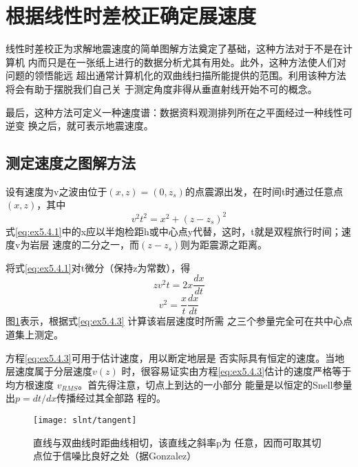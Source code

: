 \section{根据线性时差校正确定展速度}
\label{sec:5.4}

线性时差校正为求解地震速度的简单图解方法奠定了基础，这种方法对于不是在计算机
内而只是在一张纸上进行的数据分析尤其有用处。此外，这种方法使人们对问题的领悟能远
超出通常计算机化的双曲线扫描所能提供的范围。利用该种方法将会有助于摆脱我们自己关
于测定角度非得从垂直射线开始不可的概念。

最后，这种方法可定义一种速度谱：数据资料观测排列所在之平面经过一种线性可逆变
换之后，就可表示地震速度。

\subsection{测定速度之图解方法}
\label{sec:5.4.1}

设有速度为v之波由位于$(x,z)=(0,z_s)$的点震源出发，在时间t时通过任意点
$(x,z)$，其中
\begin{equation}
v^2t^2=x^2+(z-z_s)^2
\label{eq:ex5.4.1}
\end{equation}
式\ref{eq:ex5.4.1}中的x应以半炮检距h或中心点y代替，这时，t就是双程旅行时间；速度v为岩层
速度的二分之一，而$(z-z_s)$则为距震源之距离。

将式\ref{eq:ex5.4.1}对t微分（保持z为常数），得
\begin{equation}
zv^2t=2x\frac{dx}{dt}
\label{eq:ex5.4.2}
\end{equation}
\begin{equation}
v^2=\frac{x}{t}\frac{dx}{dt}
\label{eq:ex5.4.3}
\end{equation}
图\ref{fig:slnt/tangent}表示，根据式\ref{eq:ex5.4.3}
计算该岩层速度时所需 之三个参量完全可在共中心点道集上测定。

方程\ref{eq:ex5.4.3}可用于估计速度，用以断定地层是
否实际具有恒定的速度。当地层速度属于分层速度$v(z)$
时，很容易证实由方程\ref{eq:ex5.4.3}估计的速度严格等于均方根速度
$v_{RMS}$。首先得注意，切点上到达的一小部分
能量是以恒定的Snell参量出$p=dt/dx$传播经过其全部路
程的。

\begin{figure}[H]
\centering
\texttt{[image: slnt/tangent]}
\caption[tangent]{直线与双曲线时距曲线相切，该直线之斜率p为
任意，因而可取其切点位于信噪比良好之处（据Gonzalez）
}
\label{fig:slnt/tangent}
\end{figure}


